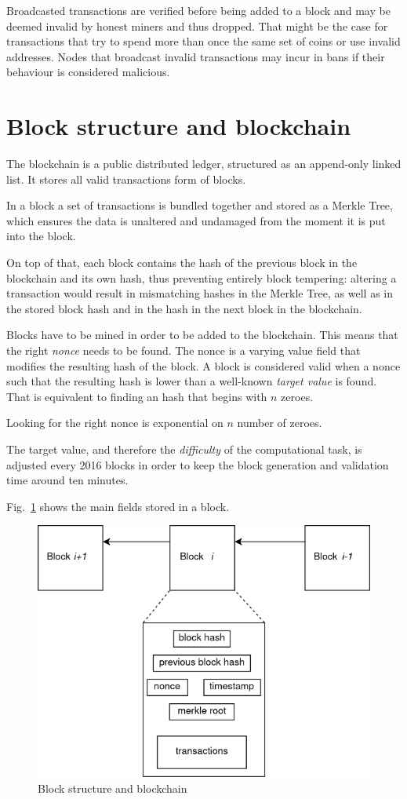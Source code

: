 Broadcasted transactions are verified before being added to a block and may be deemed invalid by honest miners and thus dropped. That might be the case for transactions that try to spend more than once the same set of coins or use invalid addresses. Nodes that broadcast invalid transactions may incur in bans if their behaviour is considered malicious.

\section{Block structure and blockchain}\label{sec:block}
The blockchain is a public distributed ledger, structured as an append-only linked list. It stores all valid transactions form of blocks.

In a block a set of transactions is bundled together and stored as a Merkle Tree, which ensures the data is unaltered and undamaged from the moment it is put into the block.

On top of that, each block contains the hash of the previous block in the blockchain and its own hash, thus preventing entirely block tempering: altering a transaction would result in mismatching hashes in the Merkle Tree, as well as in the stored block hash and in the hash in the next block in the blockchain.

Blocks have to be mined in order to be added to the blockchain. This means that the right \emph{nonce} needs to be found. The nonce is a varying value field that modifies the resulting hash of the block. A block is considered valid when a nonce such that the resulting hash is lower than a well-known \emph{target value} is found. That is equivalent to finding an hash that begins with $n$ zeroes.

Looking for the right nonce is exponential on $n$ number of zeroes.

The target value, and therefore the \emph{difficulty} of the computational task, is adjusted every 2016 blocks in order to keep the block generation and validation time around ten minutes.

Fig.~\ref{fig:blockstruct} shows the main fields stored in a block.

\begin{figure}[h]
	\includegraphics[width=.55\textwidth]{pict/blockstruct.png}
	\centering
	\caption{Block structure and blockchain}
	\label{fig:blockstruct}
\end{figure}

